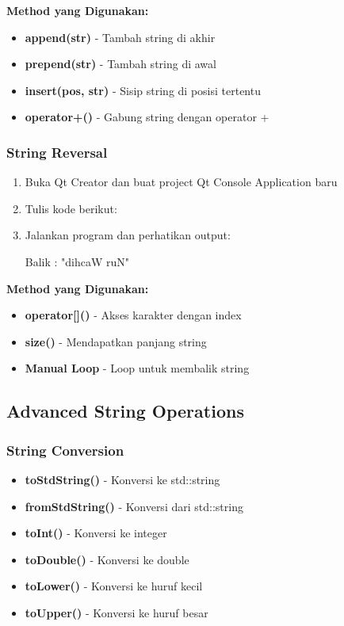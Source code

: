 \textbf{Method yang Digunakan:}
\begin{itemize}
\item \textbf{append(str)} - Tambah string di akhir
\item \textbf{prepend(str)} - Tambah string di awal
\item \textbf{insert(pos, str)} - Sisip string di posisi tertentu
\item \textbf{operator+()} - Gabung string dengan operator +
\end{itemize}

\subsubsection{String Reversal}

\begin{enumerate}
\item Buka Qt Creator dan buat project Qt Console Application baru
\item Tulis kode berikut:



\item Jalankan program dan perhatikan output:

\begin{lcverbatim}
Balik :  "dihcaW ruN"
\end{lcverbatim}
\end{enumerate}

\textbf{Method yang Digunakan:}
\begin{itemize}
\item \textbf{operator[]()} - Akses karakter dengan index
\item \textbf{size()} - Mendapatkan panjang string
\item \textbf{Manual Loop} - Loop untuk membalik string
\end{itemize}

\subsection{Advanced String Operations}

\subsubsection{String Conversion}

\begin{itemize}
\item \textbf{toStdString()} - Konversi ke std::string
\item \textbf{fromStdString()} - Konversi dari std::string
\item \textbf{toInt()} - Konversi ke integer
\item \textbf{toDouble()} - Konversi ke double
\item \textbf{toLower()} - Konversi ke huruf kecil
\item \textbf{toUpper()} - Konversi ke huruf besar
\end{itemize}

